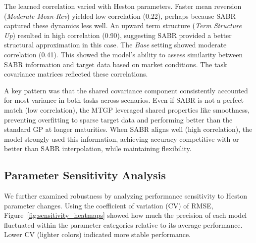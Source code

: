 \documentclass[preprint,12pt]{elsarticle}
\begin{document}
The learned correlation varied with Heston parameters. Faster mean reversion (\textit{Moderate Mean-Rev}) yielded low correlation (0.22), perhaps because SABR captured these dynamics less well. An upward term structure (\textit{Term Structure Up}) resulted in high correlation (0.90), suggesting SABR provided a better structural approximation in this case. The \textit{Base} setting showed moderate correlation (0.41). This showed the model's ability to assess similarity between SABR information and target data based on market conditions. The task covariance matrices reflected these correlations.

A key pattern was that the shared covariance component consistently accounted for most variance in both tasks across scenarios. Even if SABR is not a perfect match (low correlation), the MTGP leveraged shared properties like smoothness, preventing overfitting to sparse target data and performing better than the standard GP at longer maturities. When SABR aligns well (high correlation), the model strongly used this information, achieving accuracy competitive with or better than SABR interpolation, while maintaining flexibility.

\subsection{Parameter Sensitivity Analysis}

We further examined robustness by analyzing performance sensitivity to Heston parameter changes. Using the coefficient of variation (CV) of RMSE, Figure~\ref{fig:sensitivity_heatmaps} showed how much the precision of each model fluctuated within the parameter categories relative to its average performance. Lower CV (lighter colors) indicated more stable performance.
\end{document}
